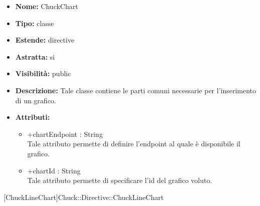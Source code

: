 			
			\begin{itemize}
			\item \textbf{Nome:} ChuckChart
			\item \textbf{Tipo:} classe
			
		\item \textbf{Estende:}
		directive
		\item \textbf{Astratta:}
		si
			\item \textbf{Visibilità:} public
			\item \textbf{Descrizione:} Tale classe contiene le parti comuni necessarie per l'inserimento di un grafico.
			\item \textbf{Attributi:}
				\begin{itemize}
				\setlength{\itemsep}{5pt}
				
					\item[\ding{111}] {+chartEndpoint : String} \\ [1mm] Tale attributo permette di definire l'endpoint al quale è disponibile il grafico.
					\item[\ding{111}] {+chartId : String} \\ [1mm] Tale attributo permette di specificare l'id del grafico voluto.
				\end{itemize}
		
			\end{itemize}

			
			[ChuckLineChart]{Chuck::Directive::ChuckLineChart}
			

	

